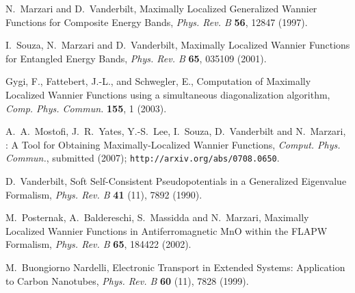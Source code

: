 \documentclass[a4paper,11pt,twoside]{book}
\begin{document}
\begin{thebibliography}{99}


 N.~Marzari and D.~Vanderbilt, 
  Maximally Localized Generalized Wannier Functions for Composite
  Energy Bands, {\it Phys. Rev. B} {\bf 56}, 12847 (1997).  

 I.~Souza, N.~Marzari and D.~Vanderbilt, Maximally
     Localized Wannier Functions for Entangled Energy Bands, {\it
     Phys. Rev. B} {\bf 65}, 035109 (2001).

 Gygi, F., Fattebert, J.-L., and Schwegler, E.,
 Computation of Maximally Localized Wannier Functions using a
 simultaneous diagonalization algorithm, {\it Comp. Phys. Commun.}
 {\bf 155}, 1 (2003).

 A.~A.~Mostofi, J.~R.~Yates, Y.-S.~Lee, I.~Souza,
   D.~Vanderbilt and N.~Marzari, \wannier: A Tool for Obtaining
   Maximally-Localized Wannier Functions, {\it Comput. Phys. Commun.},
   submitted (2007); {\tt http://arxiv.org/abs/0708.0650}.

 D.~Vanderbilt, Soft Self-Consistent Pseudopotentials in
  a Generalized Eigenvalue Formalism, {\it Phys. Rev. B} {\bf 41}
  (11), 7892 (1990).

 M.~Posternak, A.~Baldereschi, S.~Massidda and
  N.~Marzari, Maximally Localized Wannier Functions in
  Antiferromagnetic MnO within the FLAPW Formalism, {\it Phys. Rev. B}
  {\bf 65}, 184422 (2002).

 M.~Buongiorno Nardelli, Electronic Transport in Extended Systems:
  Application to Carbon Nanotubes, {\it Phys. Rev. B} {\bf 60}
  (11), 7828 (1999).


\end{thebibliography}
\end{document}
